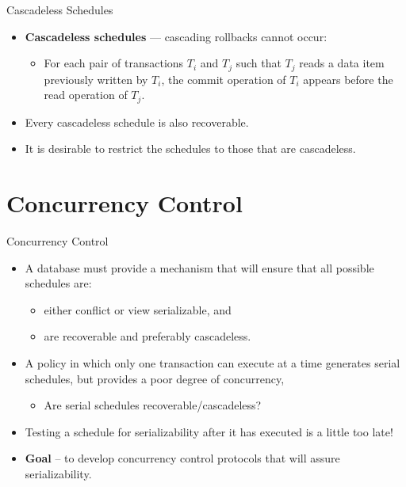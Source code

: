 \documentclass{beamer}
\begin{document}
\begin{frame}{Cascadeless Schedules}

    \begin{itemize}
        \item \textbf{Cascadeless schedules} — cascading rollbacks cannot occur:
            \begin{itemize}
                \item For each pair of transactions $T_i$ and $T_j$ such that $T_j$ reads a data item previously written by $T_i$, the commit operation of $T_i$ appears before the read operation of $T_j$.
            \end{itemize}
        \item Every cascadeless schedule is also recoverable.
        \item It is desirable to restrict the schedules to those that are cascadeless.
    \end{itemize}

\end{frame}

\section{Concurrency Control}

\begin{frame}{Concurrency Control}

    \begin{itemize}
        \item A database must provide a mechanism that will ensure that all possible schedules are:
            \begin{itemize}
                \item either conflict or view serializable, and
                \item are recoverable and preferably cascadeless.
            \end{itemize}
        \item A policy in which only one transaction can execute at a time generates serial schedules, but provides a poor degree of concurrency,
            \begin{itemize}
                \item Are serial schedules recoverable/cascadeless?
            \end{itemize}
        \item Testing a schedule for serializability after it has executed is a little too late!
        \item \textbf{Goal} – to develop concurrency control protocols that will assure serializability.
    \end{itemize}

\end{frame}
\end{document}
